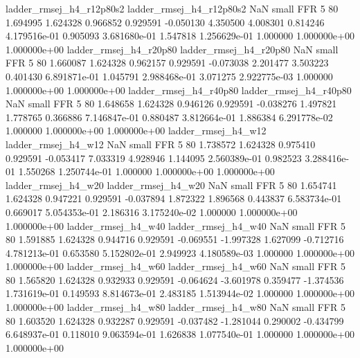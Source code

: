 ladder_rmsej_h4_r12p80s2 ladder_rmsej_h4_r12p80s2                   NaN      small      FFR                 5 80 1.694995       1.624328 0.966852       0.929591   -0.050130      4.350500      4.008301     0.814246   4.179516e-01  0.905093 3.681680e-01     1.547818   1.256629e-01            1.000000    1.000000e+00        1.000000e+00
  ladder_rmsej_h4_r20p80   ladder_rmsej_h4_r20p80                   NaN      small      FFR                 5 80 1.660087       1.624328 0.962157       0.929591   -0.073038      2.201477      3.503223     0.401430   6.891871e-01  1.045791 2.988468e-01     3.071275   2.922775e-03            1.000000    1.000000e+00        1.000000e+00
  ladder_rmsej_h4_r40p80   ladder_rmsej_h4_r40p80                   NaN      small      FFR                 5 80 1.648658       1.624328 0.946126       0.929591   -0.038276      1.497821      1.778765     0.366886   7.146847e-01  0.880487 3.812664e-01     1.886384   6.291778e-02            1.000000    1.000000e+00        1.000000e+00
     ladder_rmsej_h4_w12      ladder_rmsej_h4_w12                   NaN      small      FFR                 5 80 1.738572       1.624328 0.975410       0.929591   -0.053417      7.033319      4.928946     1.144095   2.560389e-01  0.982523 3.288416e-01     1.550268   1.250744e-01            1.000000    1.000000e+00        1.000000e+00
     ladder_rmsej_h4_w20      ladder_rmsej_h4_w20                   NaN      small      FFR                 5 80 1.654741       1.624328 0.947221       0.929591   -0.037894      1.872322      1.896568     0.443837   6.583734e-01  0.669017 5.054353e-01     2.186316   3.175240e-02            1.000000    1.000000e+00        1.000000e+00
     ladder_rmsej_h4_w40      ladder_rmsej_h4_w40                   NaN      small      FFR                 5 80 1.591885       1.624328 0.944716       0.929591   -0.069551     -1.997328      1.627099    -0.712716   4.781213e-01  0.653580 5.152802e-01     2.949923   4.180589e-03            1.000000    1.000000e+00        1.000000e+00
     ladder_rmsej_h4_w60      ladder_rmsej_h4_w60                   NaN      small      FFR                 5 80 1.565820       1.624328 0.932933       0.929591   -0.064624     -3.601978      0.359477    -1.374536   1.731619e-01  0.149593 8.814673e-01     2.483185   1.513944e-02            1.000000    1.000000e+00        1.000000e+00
     ladder_rmsej_h4_w80      ladder_rmsej_h4_w80                   NaN      small      FFR                 5 80 1.603520       1.624328 0.932287       0.929591   -0.037482     -1.281044      0.290002    -0.434799   6.648937e-01  0.118010 9.063594e-01     1.626838   1.077540e-01            1.000000    1.000000e+00        1.000000e+00
